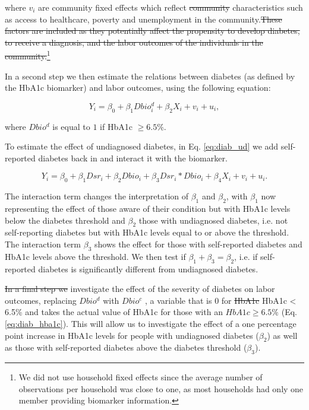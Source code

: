 \documentclass[12pt,english]{article}
\providecommand{\DIFaddtex}[1]{{\protect\color{blue}\uwave{#1}}} %
\providecommand{\DIFdeltex}[1]{{\protect\color{red}\sout{#1}}}                      %
\providecommand{\DIFaddbegin}{} %
\providecommand{\DIFaddend}{} %
\providecommand{\DIFdelbegin}{} %
\providecommand{\DIFdelend}{} %
\providecommand{\DIFadd}[1]{\texorpdfstring{\DIFaddtex{#1}}{#1}} %
\providecommand{\DIFdel}[1]{\texorpdfstring{\DIFdeltex{#1}}{}} %
\begin{document}
where $v_{i}$ are community fixed effects which reflect \DIFdelbegin \DIFdel{community }\DIFdelend \DIFaddbegin \DIFadd{local unobserved }\DIFaddend characteristics such as access to healthcare, poverty and unemployment in the community.\DIFdelbegin \DIFdel{These factors are included as they potentially affect the propensity to develop diabetes, to receive a diagnosis, and the labor outcomes of the individuals in the community.}\DIFdelend \footnote{We did not use household fixed effects since the average number of observations per household was close to one, as most households had only one member providing biomarker information.}

In a second step we then estimate the relations between diabetes (as defined by the \ac{HbA1c} biomarker) and labor outcomes, using the following equation:

\begin{equation}
Y_{i}=\beta_{0}+\beta_{1}Dbio^{d}_{i}+\beta_{2}X_{i}+v_{i}+u_{i}\label{eq:diab},
\end{equation}

where $Dbio^{d}$ is equal to $1$ if \ac{HbA1c} $\geq6.5\%$. 

To estimate the effect of undiagnosed diabetes, in Eq. \ref{eq:diab_ud} we add self-reported diabetes back in and interact it with the biomarker.

\begin{equation}
Y_{i}=\beta_{0}+\beta_{1}Dsr_{i}+\beta_{2}Dbio_{i}+\beta_{3}Dsr_{i}*Dbio_{i}+\beta_{4}X_{i}+v_{i}+u_{i}.\label{eq:diab_ud}
\end{equation}

The interaction term changes the interpretation of $\beta_{1}$ and $\beta_{2}$, with $\beta_{1}$ now representing the effect of those aware of their condition but with \ac{HbA1c} levels below the diabetes threshold and $\beta_{2}$ those with undiagnosed diabetes, i.e. not self-reporting diabetes but with \ac{HbA1c} levels equal to or above the threshold. The interaction term $\beta_{3}$ shows the effect for those with self-reported diabetes and \ac{HbA1c} levels above the threshold. We then test if $\beta_{1} + \beta_{3} = \beta_{2}$, i.e. if self-reported diabetes is significantly different from undiagnosed diabetes.

\DIFdelbegin \DIFdel{In a final step we }\DIFdelend \DIFaddbegin \DIFadd{We further }\DIFaddend investigate the effect of the severity of diabetes on labor outcomes, replacing $Dbio^{d}$ with $Dbio^{c}$ , a variable that is 0 for \DIFdelbegin \DIFdel{HbA1c }\DIFdelend \DIFaddbegin \ac{HbA1c} \DIFaddend < 6.5\% and takes the actual value of \ac{HbA1c} for those with an $HbA1c \geq 6.5\%$ (Eq. \ref{eq:diab_hba1c}). This will allow us to investigate the effect of a one percentage point increase in \ac{HbA1c} levels for people with undiagnosed diabetes ($\beta_{2}$) as well as those with self-reported diabetes above the diabetes threshold ($\beta_{3}$).
\end{document}
